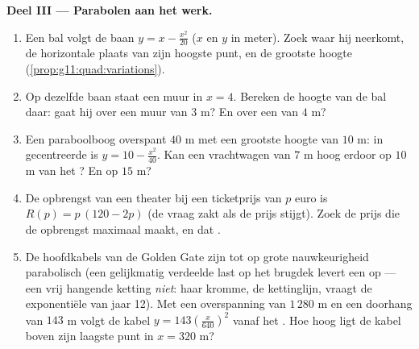 \begin{problem}
\medskip
\noindent\textbf{Deel III --- Parabolen aan het werk.}
\begin{enumerate}[resume]
  \item Een bal volgt de baan $y = x - \frac{x^2}{20}$ ($x$ en $y$ in meter).
        Zoek waar hij neerkomt, de horizontale plaats van zijn hoogste punt,
        en de grootste hoogte (\cref{prop:g11:quad:variations}).
  \item Op dezelfde baan staat een muur in $x = 4$. Bereken de hoogte van de
        bal daar: gaat hij over een muur van $3$ m? En over een van $4$ m?
  \item Een paraboolboog overspant $40$ m met een grootste hoogte van $10$
        m: in gecentreerde  is $y = 10 - \frac{x^2}{40}$. Kan een
        vrachtwagen van $7$ m hoog erdoor op $10$ m van het ? En op
        $15$ m?
  \item De opbrengst van een theater bij een ticketprijs van $p$ euro is
        $R(p) = p\,(120 - 2p)$ (de vraag zakt als de prijs stijgt). Zoek de
        prijs die de opbrengst maximaal maakt, en dat .
  \item De hoofdkabels van de Golden Gate zijn tot op grote nauwkeurigheid
        parabolisch (een gelijkmatig verdeelde last op het brugdek levert een
         op --- een vrij hangende ketting \emph{niet}: haar kromme, de
        kettinglijn, vraagt de exponentiële  van jaar 12). Met een
        overspanning van $1\,280$ m en een doorhang van $143$ m volgt de
        kabel $y = 143\left(\frac{x}{640}\right)^2$ vanaf het . Hoe
        hoog ligt de kabel boven zijn laagste punt in $x = 320$ m?
\end{enumerate}


\end{problem}
